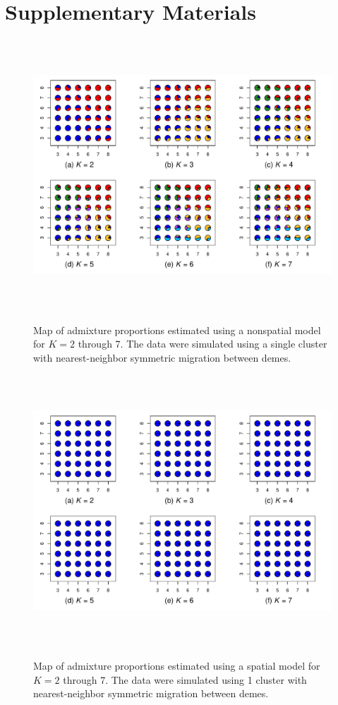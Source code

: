 \documentclass[12pt]{article}
\begin{document}
\newpage
\section*{Supplementary Materials}
\renewcommand{\theequation}{S\arabic{equation}}
\setcounter{equation}{0}
\renewcommand{\thetable}{S\arabic{table}}
\setcounter{table}{0}
\renewcommand{\thefigure}{S\arabic{figure}}
\setcounter{figure}{0}

\newpage
\begin{figure}
	\centering
		{\includegraphics[width=6in,height=4in]{figs/sims/simK1_nsp_pies.pdf}}
	\caption{
	Map of admixture proportions estimated using a nonspatial model for $K=2$ through 7.
	The data were simulated using a single cluster with nearest-neighbor symmetric migration between demes.
    }\label{simK1_nsp_pies}
\end{figure}

\begin{figure}
	\centering
		{\includegraphics[width=6in,height=4in]{figs/sims/simK1_sp_pies.pdf}}
	\caption{
	Map of admixture proportions estimated using a spatial model for $K=2$ through 7.
	The data were simulated using 1 cluster with nearest-neighbor symmetric migration between demes.
    }\label{simK1_sp_pies}
\end{figure}
\end{document}
